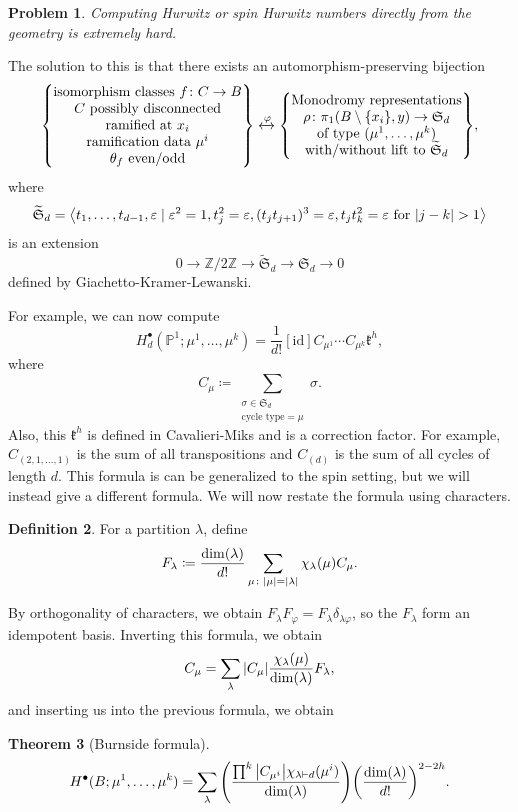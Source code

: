 \documentclass[leqno, openany]{memoir}
\newtheorem{thm}{Theorem}[section]
\newtheorem{prob}[thm]{Problem}
\theoremstyle{definition}
\newtheorem{defn}[thm]{Definition}
\theoremstyle{remark}
\theoremstyle{plain}
\theoremstyle{definition}
\theoremstyle{remark}
\newcommand{\Z}{\mathbb{Z}}
\renewcommand{\P}{\mathbb{P}}
\newcommand{\ep}{\varepsilon}
\newcommand{\mf}[1]{\mathfrak{#1}}
\newcommand{\mr}[1]{\mathrm{#1}}
\newcommand{\wt}[1]{\widetilde{#1}}
\begin{document}
\begin{prob}
Computing Hurwitz or spin Hurwitz numbers directly from the geometry is extremely hard.
\end{prob}

The solution to this is that there exists an automorphism-preserving bijection
\[ \qty{\Centerstack{{isomorphism classes $f \colon C \to B$} {$C$ possibly disconnected} {ramified at $x_i$} {ramification data $\mu^i$} {$\theta_f$ even/odd}}} \xleftrightarrow{\varphi} \qty{\Centerstack{{Monodromy representations} {$\rho \colon \pi_1(B \setminus \qty{x_i}, y) \to \mf{S}_d$} {of type $(\mu^1, \ldots, \mu^k)$} {with/without lift to $\wt{\mf{S}}_d$}}}, \]
where
\[ \wt{\mf{S}}_d = \ev{t_1, \ldots, t_{d-1}, \ep \mid \ep^2=1, t_j^2 = \ep, (t_jt_{j+1})^3 = \ep, t_jt_k^2=\ep \text{ for } \abs{j-k} > 1} \]
is an extension
\[ 0 \to \Z/2\Z \to \wt{\mf{S}}_d \to \mf{S}_d \to 0 \]
defined by Giachetto-Kramer-Lewanski.

For example, we can now compute
\[ H_d^{\bullet}(\P^1; \mu^1, \ldots, \mu^k) = \frac{1}{d!} [\mr{id}] C_{\mu^1} \cdots C_{\mu^k} \mf{k}^h, \]
where
\[ C_{\mu} \coloneqq \sum_{\substack{\sigma \in \mf{S}_d \\ \text{cycle type} = \mu}} \sigma. \]
Also, this $\mf{k}^h$ is defined in Cavalieri-Miks and is a correction factor.
For example, $C_{(2,1,\ldots,1)}$ is the sum of all transpositions and $C_{(d)}$ is the sum of all cycles of length $d$. This formula is can be generalized to the spin setting, but we will instead give a different formula. We will now restate the formula using characters.

\begin{defn}
  For a partition $\lambda$, define
  \[ F_{\lambda} \coloneqq \frac{\dim(\lambda)}{d!} \sum_{\mu \colon \abs{\mu} = \abs{\lambda}} \chi_{\lambda}(\mu) C_{\mu}. \]
\end{defn}
By orthogonality of characters, we obtain $F_{\lambda} F_{\varphi} = F_{\lambda} \delta_{\lambda \varphi}$, so the $F_{\lambda}$ form an idempotent basis. Inverting this formula, we obtain
\[ C_{\mu} = \sum_{\lambda} \abs{C_{\mu}} \frac{\chi_{\lambda}(\mu)}{\dim(\lambda)} F_{\lambda}, \]
and inserting us into the previous formula, we obtain

\begin{thm}[Burnside formula]
  \[ H^{\bullet}(B;\mu^1, \ldots, \mu^k) = \sum_{\lambda} \qty(\frac{\prod^k \abs{C_{\mu^i}} \chi_{\lambda \vdash d}(\mu^i)}{\dim(\lambda)}) \qty(\frac{\dim(\lambda)}{d!})^{2-2h}. \]
\end{thm}
\end{document}
